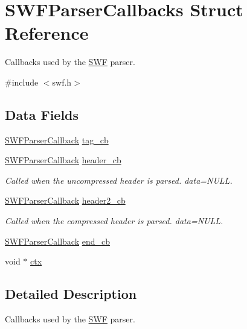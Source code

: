 \hypertarget{struct_s_w_f_parser_callbacks}{\section{S\-W\-F\-Parser\-Callbacks Struct Reference}
\label{struct_s_w_f_parser_callbacks}
}


Callbacks used by the \hyperlink{struct_s_w_f}{S\-W\-F} parser.  




{\ttfamily \#include $<$swf.\-h$>$}

\subsection*{Data Fields}
\begin{DoxyCompactItemize}
\item 
\hyperlink{swf_8h_a42e43a257dad85b4e1368d3a3de56cee}{S\-W\-F\-Parser\-Callback} \hyperlink{struct_s_w_f_parser_callbacks_a898af2d0db9d2d038e4d9c039ea91ac2}{tag\-\_\-cb}
\item 
\hyperlink{swf_8h_a42e43a257dad85b4e1368d3a3de56cee}{S\-W\-F\-Parser\-Callback} \hyperlink{struct_s_w_f_parser_callbacks_a894666f68df70f79b7b2bed33cccf498}{header\-\_\-cb}
\begin{DoxyCompactList}\small\item\em Called when the uncompressed header is parsed. data=N\-U\-L\-L. \end{DoxyCompactList}\item 
\hyperlink{swf_8h_a42e43a257dad85b4e1368d3a3de56cee}{S\-W\-F\-Parser\-Callback} \hyperlink{struct_s_w_f_parser_callbacks_a21beaa520990137cfe64ee20d5eb6054}{header2\-\_\-cb}
\begin{DoxyCompactList}\small\item\em Called when the compressed header is parsed. data=N\-U\-L\-L. \end{DoxyCompactList}\item 
\hyperlink{swf_8h_a42e43a257dad85b4e1368d3a3de56cee}{S\-W\-F\-Parser\-Callback} \hyperlink{struct_s_w_f_parser_callbacks_a31cb75f39add22bb824685d6d7ba07a1}{end\-\_\-cb}
\item 
void $\ast$ \hyperlink{struct_s_w_f_parser_callbacks_a580259560295835647b2ac312addaf9c}{ctx}
\end{DoxyCompactItemize}


\subsection{Detailed Description}
Callbacks used by the \hyperlink{struct_s_w_f}{S\-W\-F} parser. 

